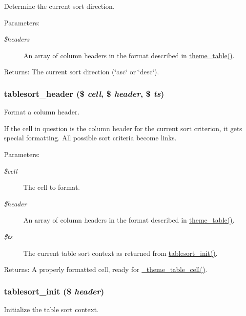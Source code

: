 Determine the current sort direction.

\begin{Desc}
\item[Parameters:]
\begin{description}
\item[{\em \$headers}]An array of column headers in the format described in \hyperlink{group__themeable_g77f053aaa73bbeaa3943bf8f06ce625d}{theme\_\-table()}. \end{description}
\end{Desc}
\begin{Desc}
\item[Returns:]The current sort direction (\char`\"{}asc\char`\"{} or \char`\"{}desc\char`\"{}). \end{Desc}
\hypertarget{tablesort_8inc_9c93c8e235c5013f0f494ba207ec1bdf}{
\subsubsection[{tablesort\_\-header}]{\setlength{\rightskip}{0pt plus 5cm}tablesort\_\-header (\$ {\em cell}, \/  \$ {\em header}, \/  \$ {\em ts})}}
\label{tablesort_8inc_9c93c8e235c5013f0f494ba207ec1bdf}


Format a column header.

If the cell in question is the column header for the current sort criterion, it gets special formatting. All possible sort criteria become links.

\begin{Desc}
\item[Parameters:]
\begin{description}
\item[{\em \$cell}]The cell to format. \item[{\em \$header}]An array of column headers in the format described in \hyperlink{group__themeable_g77f053aaa73bbeaa3943bf8f06ce625d}{theme\_\-table()}. \item[{\em \$ts}]The current table sort context as returned from \hyperlink{tablesort_8inc_fee7fc97d83c8e51399e9b41ccbae927}{tablesort\_\-init()}. \end{description}
\end{Desc}
\begin{Desc}
\item[Returns:]A properly formatted cell, ready for \hyperlink{includes_2theme_8inc_df2a29e2c6631b7c0ecd833cafda9b40}{\_\-theme\_\-table\_\-cell()}. \end{Desc}
\hypertarget{tablesort_8inc_fee7fc97d83c8e51399e9b41ccbae927}{
\subsubsection[{tablesort\_\-init}]{\setlength{\rightskip}{0pt plus 5cm}tablesort\_\-init (\$ {\em header})}}
\label{tablesort_8inc_fee7fc97d83c8e51399e9b41ccbae927}


Initialize the table sort context. 